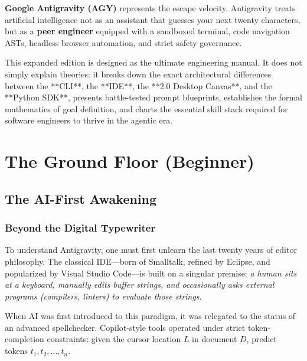 \documentclass[11pt,a4paper,oneside]{book}
\begin{document}
\textbf{Google Antigravity (AGY)} represents the escape velocity. Antigravity treats artificial intelligence not as an assistant that guesses your next twenty characters, but as a \textbf{peer engineer} equipped with a sandboxed terminal, code navigation ASTs, headless browser automation, and strict safety governance.

This expanded edition is designed as the ultimate engineering manual. It does not simply explain theories: it breaks down the exact architectural differences between the **CLI**, the **IDE**, the **2.0 Desktop Canvas**, and the **Python SDK**, presents battle-tested prompt blueprints, establishes the formal mathematics of goal definition, and charts the essential skill stack required for software engineers to thrive in the agentic era.

\tableofcontents

\mainmatter

\part{The Ground Floor (Beginner)}

\chapter{The AI-First Awakening}

\section{Beyond the Digital Typewriter}
To understand Antigravity, one must first unlearn the last twenty years of editor philosophy. The classical IDE—born of Smalltalk, refined by Eclipse, and popularized by Visual Studio Code—is built on a singular premise: \textit{a human sits at a keyboard, manually edits buffer strings, and occasionally asks external programs (compilers, linters) to evaluate those strings}.

When AI was first introduced to this paradigm, it was relegated to the status of an advanced spellchecker. Copilot-style tools operated under strict token-completion constraints: given the cursor location $L$ in document $D$, predict tokens $t_{1}, t_{2}, \dots, t_{n}$. 
\end{document}
